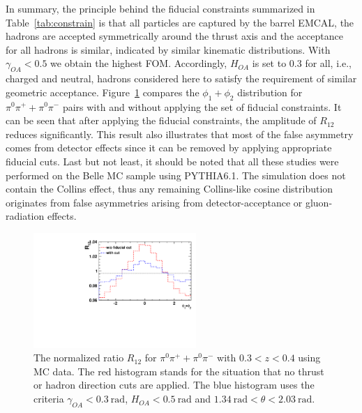 In summary, the principle behind the fiducial constraints summarized in Table~\ref{tab:constrain} is that all particles are captured by the barrel EMCAL, the hadrons are accepted symmetrically around the thrust axis and the acceptance for all hadrons is similar, indicated by similar kinematic distributions. With $\gamma_{OA}<0.5$ we obtain the highest FOM. Accordingly, $H_{OA}$ is set to 0.3 for all, i.e., charged and neutral, hadrons considered here to satisfy the requirement of similar geometric acceptance. Figure~\ref{fig:differentthetarange} compares the $\phi_1+\phi_2$ distribution for $\pi^0\pi^++\pi^0\pi^-$ pairs with and without applying the set of fiducial constraints. It can be seen that after applying the fiducial constraints, the amplitude of $R_{12}$ reduces significantly. This result also illustrates that  most of the false asymmetry comes from  detector effects since it can be removed by applying appropriate fiducial cuts. Last but not least, it should be noted that all these studies were performed on the Belle MC sample using PYTHIA6.1. The simulation does not contain the Collins effect, thus any remaining Collins-like cosine distribution originates from false asymmetries arising from detector-acceptance or gluon-radiation effects. 
\begin{figure}[h]
    \centering
    \includegraphics[width=0.55\textwidth,natwidth=610,natheight=642]{figure_dataselection/DetectorEffect.pdf}
    \caption[Normalized ratio $R_{12}$ for $\pi^0\pi^++\pi^0\pi^-$ with $0.3<z<0.4$ using MC data]{The normalized ratio $R_{12}$ for $\pi^0\pi^++\pi^0\pi^-$ with $0.3<z<0.4$ using MC data. The red histogram stands for the situation that no thrust or hadron direction cuts are applied. The blue histogram uses the criteria $\gamma_{OA} <0.3~\text{rad}$, $H_{OA}<0.5~\text{rad}$ and $1.34~\text{rad}<\theta<2.03~\text{rad}$.}
    \label{fig:differentthetarange}
\end{figure}


